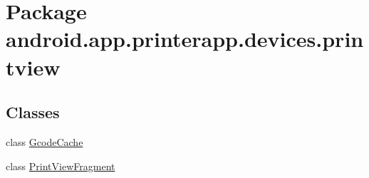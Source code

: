 \hypertarget{namespaceandroid_1_1app_1_1printerapp_1_1devices_1_1printview}{}\section{Package android.\+app.\+printerapp.\+devices.\+printview}
\label{namespaceandroid_1_1app_1_1printerapp_1_1devices_1_1printview}
\subsection*{Classes}
\begin{DoxyCompactItemize}
\item 
class \hyperlink{classandroid_1_1app_1_1printerapp_1_1devices_1_1printview_1_1_gcode_cache}{Gcode\+Cache}
\item 
class \hyperlink{classandroid_1_1app_1_1printerapp_1_1devices_1_1printview_1_1_print_view_fragment}{Print\+View\+Fragment}
\end{DoxyCompactItemize}
